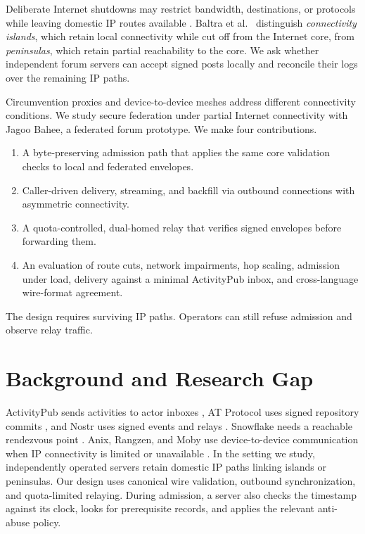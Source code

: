 \documentclass[conference,a4paper,10pt]{IEEEtran}
\begin{document}
Deliberate Internet shutdowns may restrict bandwidth, destinations, or protocols while leaving domestic IP routes available \cite{ooni2025bangladesh,bischof2023shutdowns}. Baltra et al.~\cite{baltra2024connectivity} distinguish \emph{connectivity islands}, which retain local connectivity while cut off from the Internet core, from \emph{peninsulas}, which retain partial reachability to the core. We ask whether independent forum servers can accept signed posts locally and reconcile their logs over the remaining IP paths.

Circumvention proxies \cite{bocovich2024snowflake} and device-to-device meshes \cite{kamali2025anix,lerner2016rangzen,pradeep2022moby} address different connectivity conditions. We study secure federation under partial Internet connectivity with Jagoo Bahee, a federated forum prototype. We make four contributions.
\begin{enumerate}
  \item A byte-preserving admission path that applies the same core validation checks to local and federated envelopes.
  \item Caller-driven delivery, streaming, and backfill via outbound connections with asymmetric connectivity.
  \item A quota-controlled, dual-homed relay that verifies signed envelopes before forwarding them.
  \item An evaluation of route cuts, network impairments, hop scaling, admission under load, delivery against a minimal ActivityPub inbox, and cross-language wire-format agreement.
\end{enumerate}
The design requires surviving IP paths. Operators can still refuse admission and observe relay traffic.

\section{Background and Research Gap}
\label{sec:background}

ActivityPub sends activities to actor inboxes \cite{activitypub}, AT Protocol uses signed repository commits \cite{atproto}, and Nostr uses signed events and relays \cite{nostr}. Snowflake needs a reachable rendezvous point \cite{bocovich2024snowflake}. Anix, Rangzen, and Moby use device-to-device communication when IP connectivity is limited or unavailable \cite{kamali2025anix,lerner2016rangzen,pradeep2022moby}. In the setting we study, independently operated servers retain domestic IP paths linking islands or peninsulas. Our design uses canonical wire validation, outbound synchronization, and quota-limited relaying. During admission, a server also checks the timestamp against its clock, looks for prerequisite records, and applies the relevant anti-abuse policy.
\end{document}
